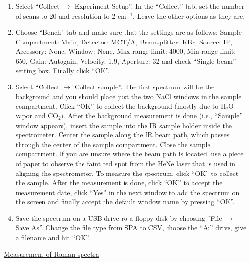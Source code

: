 \documentclass[byrevtex,amssymb,aps,pra,floatfix,letterpaper]{revtex4}
\begin{document}
\begin{enumerate}
\item Select ``Collect $\to$ Experiment Setup''. In the ``Collect'' tab, set the number of scans to 20 and resolution to 2 cm$^{-1}$. Leave the other options as they are.

\item Choose ``Bench'' tab and make sure that the settings are as follows: Sample Compartment: Main, Detector: MCT/A, Beamsplitter: KBr, Source: IR, Accessory: None, Window: None, Max range limit: 4000, Min range limit: 650, Gain: Autogain, Velocity: 1.9, Aperture: 32 and check ``Single beam'' setting box. Finally click ``OK''.

\item Select ``Collect $\to$ Collect sample''. The first spectrum will be the background and you should place just the two NaCl windows in the sample compartment. Click ``OK'' to collect the background (mostly due to H$_2$O vapor and CO$_2$). After the background measurement is done (i.e., ``Sample'' window appears), insert the sample into the IR sample holder inside the spectrometer. Center the sample along the IR beam path, which passes through the center of the sample compartment. Close the sample compartment. If you are unsure where the beam path is located, use a piece of paper to observe the faint red spot from the HeNe laser that is used in aligning the spectrometer. To measure the spectrum, click ``OK'' to collect the sample. After the measurement is done, click ``OK'' to accept the measurement date, click ``Yes'' in the next window to add the spectrum on the screen and finally accept the default window name by pressing ``OK''.

\item Save the spectrum on a USB drive ro a floppy disk by choosing ``File $\to$ Save As''. Change the file type from SPA to CSV, choose the ``A:'' drive, give a filename and hit ``OK''.
\end{enumerate}

\noindent
\underline{Measurement of Raman spectra}\\
\end{document}
